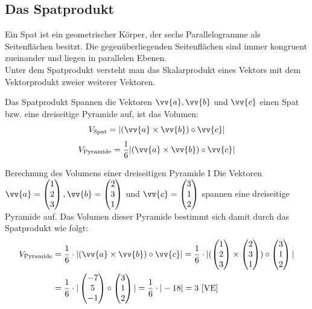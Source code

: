 \subsection{Das Spatprodukt}
Ein Spat ist ein geometrischer Körper, der sechs Parallelogramme als Seitenflächen besitzt. Die gegenüberliegenden Seitenflächen sind immer kongruent zueinander und liegen in parallelen Ebenen.\\
Unter dem Spatprodukt versteht man das Skalarprodukt eines Vektors mit dem Vektorprodukt zweier weiterer Vektoren.
\begin{defi}{Das Spatprodukt}{}
Spannen die Vektoren $\vv{a}, \vv{b}$ und $\vv{c}$ einen Spat bzw. eine dreiseitige Pyramide auf, ist das Volumen:
\[V_{\text{Spat}} = |(\vv{a}\times\vv{b})\circ \vv{c}|\] \[V_{\text{Pyramide}}=\dfrac{1}{6}|(\vv{a}\times\vv{b})\circ \vv{c}| \]
\end{defi} 
\begin{bsp}{Berechnung des Volumens einer dreiseitigen Pyramide I}{}
Die Vektoren $\vv{a} = \begin{pmatrix} 1\\2\\3
\end{pmatrix}, \vv{b}= \begin{pmatrix}
    2\\3\\1
\end{pmatrix}$ und $\vv{c}= \begin{pmatrix}
   3\\1\\2
\end{pmatrix}$ spannen eine dreiseitige Pyramide auf. Das Volumen dieser Pyramide bestimmt sich damit durch das Spatprodukt wie folgt:
\begin{equation*}
    \begin{split}
      V_{\text{Pyramide}} &= \dfrac{1}{6} \cdot |(\vv{a}\times \vv{b})\circ \vv{c}| = \dfrac{1}{6} \cdot |(\begin{pmatrix}1\\2\\3\end{pmatrix} \times 
\begin{pmatrix} 2\\3\\1 \end{pmatrix}) \circ 
\begin{pmatrix} 3\\1\\2 \end{pmatrix}|\\
&=\dfrac{1}{6} \cdot |\begin{pmatrix} -7\\5\\-1 \end{pmatrix}\circ \begin{pmatrix} 3\\1\\2 \end{pmatrix}|  =\dfrac{1}{6} \cdot |-18| = 3\ \text{[VE]}
    \end{split}
\end{equation*}
\end{bsp}

